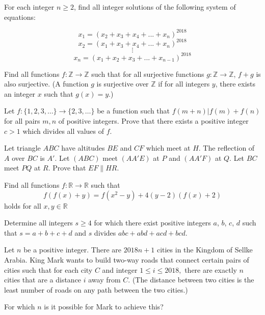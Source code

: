 \documentclass[11pt]{scrartcl}
\begin{document}
\begin{problem}[204202362084074]
	For each integer $n \ge 2$, find all integer solutions of the following system of equations:

\[x_1 = (x_2 + x_3 + x_4 + ... + x_n)^{2018}\]\[x_2 = (x_1 + x_3 + x_4 + ... + x_n)^{2018}\]\[\vdots\]\[x_n = (x_1 + x_2 + x_3 + ... + x_{n - 1})^{2018}\]
\end{problem}
\begin{problem}[205642765475865]
Find all functions $f:\mathbb Z\to \mathbb Z$ such that for all surjective functions $g:\mathbb Z\to \mathbb Z$, $f+g$ is also surjective. (A function $g$ is surjective over $\mathbb Z$ if for all integers $y$, there exists an integer $x$ such that $g(x)=y$.)
\end{problem}
\begin{problem}[208441124738479]
Let $f : \{ 1, 2, 3, \dots \} \to \{ 2, 3, \dots \}$ be a function such that $f(m + n) | f(m) + f(n) $ for all pairs $m,n$ of positive integers. Prove that there exists a positive integer $c > 1$ which divides all values of $f$.
\end{problem}
\begin{problem}[210358073900610]
Let triangle $ABC$ have altitudes $BE$ and $CF$ which meet at $H$. The reflection of $A$ over $BC$ is $A'$. Let $(ABC)$ meet $(AA'E)$ at $P$ and $(AA'F)$ at $Q$. Let $BC$ meet $PQ$ at $R$. Prove that $EF \parallel HR$.
\end{problem}
\begin{problem}[211238364293464]
Find all functions $ f: \mathbb{R} \to \mathbb{R} $ such that$$ f\left(f\left(x\right)+y\right) = f\left(x^2-y\right)+4\left(y-2\right)\left(f\left(x\right)+2\right) $$holds for all $ x, y \in \mathbb{R} $
\end{problem}
\begin{problem}[211625179383762]
Determine all integers $s \ge 4$ for which there exist positive integers $a$, $b$, $c$, $d$ such that $s = a+b+c+d$ and $s$ divides $abc+abd+acd+bcd$.
\end{problem}
\begin{problem}[212792614834869]
Let $n$ be a positive integer. There are $2018n+1$ cities in the Kingdom of Sellke Arabia. King Mark wants to build two-way roads that connect certain pairs of cities such that for each city $C$ and integer $1\le i\le 2018,$ there are exactly $n$ cities that are a distance $i$ away from $C.$ (The distance between two cities is the least number of roads on any path between the two cities.)

For which $n$ is it possible for Mark to achieve this?
\end{problem}
\end{document}
